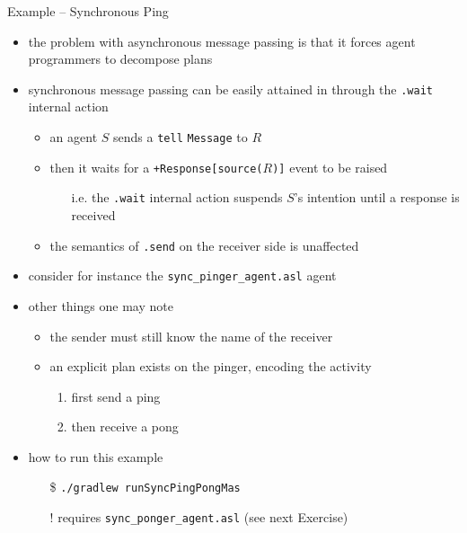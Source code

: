 \documentclass[presentation]{beamer}\mode<presentation>{\usetheme{AMSBolognaFC}}
\begin{document}
\begin{frame}[c, allowframebreaks]{Example \theJasonExample{} -- Synchronous Ping}
\begin{itemize}
    
    \item the problem with asynchronous message passing is that it forces agent programmers to decompose plans
    
    \vspace{.3cm}
    
    \item synchronous message passing can be easily attained in \jason{} through the \texttt{.wait} internal action
    \begin{itemize}
        \item an agent $S$ sends a \alert{\texttt{tell}} \texttt{Message} to $R$
        \item then it waits for a \texttt{+Response[source($R$)]} event to be raised
        \begin{itemize}
            \item[i.e.] the \texttt{.wait} internal action suspends $S$'s intention until a response is received
        \end{itemize}
        \item the semantics of  \texttt{.send} on the receiver side is unaffected
    \end{itemize}
    
    \framebreak
    
    \item consider for instance the \texttt{sync\_pinger\_agent.asl} agent
    
    
    \vspace{.3cm}
    
    \item other things one may note
    \begin{itemize}
        \item the sender must still know the name of the receiver
        \item an explicit plan exists on the pinger, encoding the activity
        \begin{enumerate}
            \item first send a ping
            \item then receive a pong
        \end{enumerate}
    \end{itemize}
    
    \vspace{.3cm}
    
    \item how to run this example
    \begin{itemize}
        \item[\$] \texttt{./gradlew run\alert{SyncPingPong}Mas}
        \item[!] requires \texttt{sync\_ponger\_agent.asl} (see next Exercise) 
    \end{itemize}
    
\end{itemize}
\end{frame}
\end{document}
